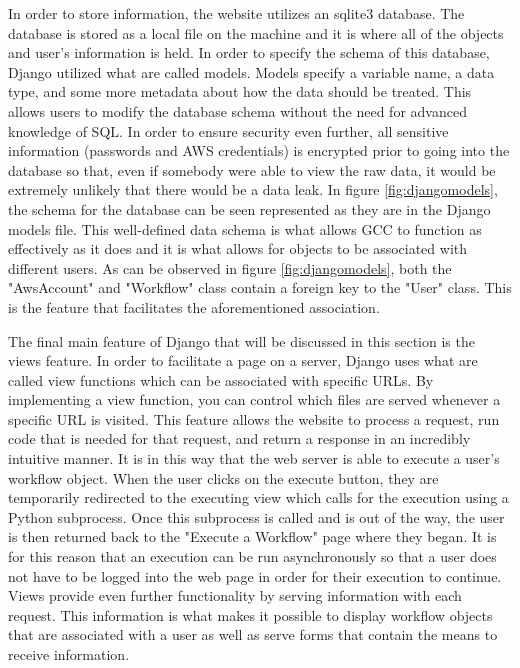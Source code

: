 \documentclass[fleqn,10pt]{SelfArx} %
\begin{document}
In order to store information, the website utilizes an sqlite3 database. The database is stored as a local file on the machine and it is where all of the objects and user’s information is held. In order to specify the schema of this database, Django utilized what are called models. Models specify a variable name, a data type, and some more metadata about how the data should be treated. This allows users to modify the database schema without the need for advanced knowledge of SQL. In order to ensure security even further, all sensitive information (passwords and AWS credentials) is encrypted prior to going into the database so that, even if somebody were able to view the raw data, it would be extremely unlikely that there would be a data leak. In figure \ref{fig:djangomodels}, the schema for the database can be seen represented as they are in the Django models file. This well-defined data schema is what allows GCC to function as effectively as it does and it is what allows for objects to be associated with different users. As can be observed in figure \ref{fig:djangomodels}, both the "AwsAccount" and "Workflow" class contain a foreign key to the "User" class. This is the feature that facilitates the aforementioned association.

The final main feature of Django that will be discussed in this section is the views feature. In order to facilitate a page on a server, Django uses what are called view functions which can be associated with specific URLs. By implementing a view function, you can control which files are served whenever a specific URL is visited. This feature allows the website to process a request, run code that is needed for that request, and return a response in an incredibly intuitive manner. It is in this way that the web server is able to execute a user’s workflow object. When the user clicks on the execute button, they are temporarily redirected to the executing view which calls for the execution using a Python subprocess. Once this subprocess is called and is out of the way, the user is then returned back to the "Execute a Workflow" page where they began. It is for this reason that an execution can be run asynchronously so that a user does not have to be logged into the web page in order for their execution to continue. Views provide even further functionality by serving information with each request. This information is what makes it possible to display workflow objects that are associated with a user as well as serve forms that contain the means to receive information.
\end{document}
